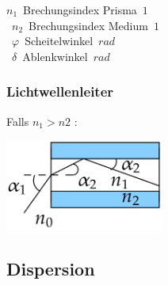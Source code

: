 \unit{$ n_1 $}{Brechungsindex Prisma}{$1$} \\
\unit{$ n_2 $}{Brechungsindex Medium}{$1$} \\
\unit{$ \varphi $}{Scheitelwinkel}{$rad$} \\
\unit{$ \delta $}{Ablenkwinkel}{$rad$} \\

\subsubsection{Lichtwellenleiter}

\begin{center}
	\begin{minipage}{0.3\textwidth}
		Falls $ n_1 > n2 $ :
	\end{minipage}%
	\begin{minipage}{0.3\textwidth}
		\includegraphics[height=3cm,keepaspectratio=true]{Images/lichtwellenleiter.png}
	\end{minipage}
\end{center}



\subsection{Dispersion}

